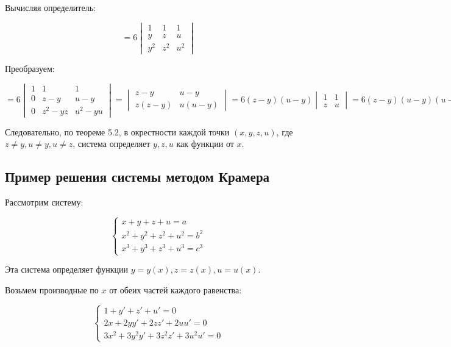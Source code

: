 {Вычисляя определитель:



\[
= 6
\begin{vmatrix}
1 & 1 & 1 \\
y & z & u \\
y^2 & z^2 & u^2
\end{vmatrix}
\]



Преобразуем:



\[
= 6
\begin{vmatrix}
1 & 1 & 1 \\
0 & z - y & u - y \\
0 & z^2 - yz & u^2 - yu
\end{vmatrix} =

\begin{vmatrix}
z - y & u - y \\
z(z - y) & u(u - y)
\end{vmatrix} 
= 6(z - y)(u - y)\begin{vmatrix}
1 & 1 \\
z & u
\end{vmatrix} = 6(z - y)(u - y)(u - z)
\]



Следовательно, по теореме 5.2, в окрестности каждой точки \( (x, y, z, u) \), где \( z \neq y, u \neq y, u \neq z \), система определяет \( y, z, u \) как функции от \( x \).

\subsection*{Пример решения системы методом Крамера}

Рассмотрим систему:



\[
\begin{cases}
x + y + z + u = a \\
x^2 + y^2 + z^2 + u^2 = b^2 \\
x^3 + y^3 + z^3 + u^3 = c^3
\end{cases}
\]



Эта система определяет функции \( y = y(x), z = z(x), u = u(x) \).

Возьмем производные по \( x \) от обеих частей каждого равенства:



\[
\begin{cases}
1 + y' + z' + u' = 0 \\
2x + 2yy' + 2zz' + 2uu' = 0 \\
3x^2 + 3y^2 y' + 3z^2 z' + 3u^2 u' = 0
\end{cases}
\]



}
